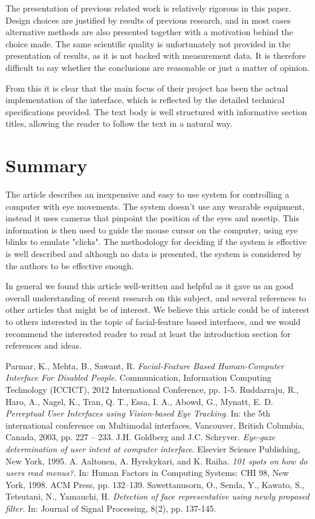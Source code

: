 \documentclass[a4paper,10pt]{article}
\begin{document}
The presentation of previous related work is relatively rigorous in this paper. Design choices are justified by results of previous research, and in most cases alternative methods are also presented together with a motivation behind the choice made. The same scientific quality is unfortunately not provided in the presentation of results, as it is not backed with measurement data. It is therefore difficult to say whether the conclusions are reasonable or just a matter of opinion.


From this it is clear that the main focus of their project has been the actual implementation of the interface, which is reflected by the detailed technical specifications provided. The text body is well structured with informative section titles, allowing the reader to follow the text in a natural way.


\section{Summary}
The article describes an inexpensive and easy to use system for controlling a computer with eye movements. The system doesn't use any wearable equipment, instead it uses cameras that pinpoint the position of the eyes and nosetip. This information is then used to guide the mouse cursor on the computer, using eye blinks to emulate "clicks". The methodology for deciding if the system is effective is well described and although no data is presented, the system is considered by the authors to be effective enough.

In general we found this article well-written and helpful as it gave us an good overall understanding of recent research on this subject, and several references to other articles that might be of interest. We believe this article could be of interest to others interested in the topic of facial-feature based interfaces, and we would recommend the interested reader to read at least the introduction section for references and ideas.



\begin{thebibliography}{4}
 Parmar, K., Mehta, B., Sawant, R. \emph{Facial-Feature Based Human-Computer Interface For Disabled People}. Communication, Information Computing Technology (ICCICT), 2012 International Conference, pp. 1-5.
 Ruddarraju, R., Haro, A., Nagel, K., Tran, Q. T., Essa, I. A., Abowd, G., Mynatt, E. D. \emph{Perceptual User Interfaces using Vision-based Eye Tracking}. In: the 5th international conference on Multimodal interfaces, Vancouver, British Columbia, Canada, 2003, pp. 227 – 233.
 J.H. Goldberg and J.C. Schryver. \emph{Eye-gaze determination of user intent at computer interface}. Elsevier Science Publishing, New York, 1995.
 A. Aaltonen, A. Hyrskykari, and K. Raiha. \emph{101 spots on how do users read menus?}. In: Human Factors in Computing Systems: CHI 98, New York, 1998. ACM Press, pp. 132–139.
 Sawettanusorn, O., Senda, Y., Kawato, S., Tetsutani, N., Yamauchi, H. \emph{Detection of face representative using newly proposed filter}. In: Journal of Signal Processing, 8(2), pp. 137-145.

\end{thebibliography}
\end{document}
